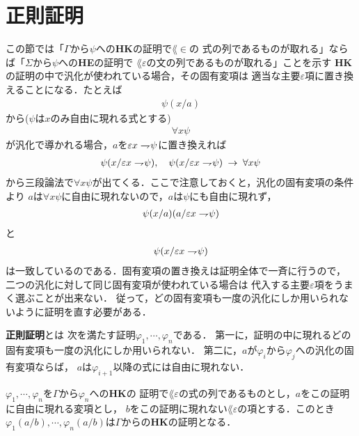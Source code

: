 \section{正則証明}
\label{sec:regular_proof}
	この節では「$\Gamma$から$\psi$への{\bf HK}の証明で$\lang{\in}$の
	式の列であるものが取れる」ならば「$\Sigma$から$\psi$への{\bf HE}の証明で
	$\lang{\varepsilon}$の文の列であるものが取れる」ことを示す
	{\bf HK}の証明の中で汎化が使われている場合，その固有変項は
	適当な主要$\varepsilon$項に置き換えることになる．たとえば
	\begin{align}
		\psi(x/a)
	\end{align}
	から($\psi$は$x$のみ自由に現れる式とする)
	\begin{align}
		\forall x \psi
	\end{align}
	が汎化で導かれる場合，$a$を$\varepsilon x \rightharpoondown\hspace{-0.25em} \psi$に置き換えれば
	\begin{align}
		\psi(x/\varepsilon x \rightharpoondown\hspace{-0.25em} \psi), 
		\quad \psi(x/\varepsilon x \rightharpoondown\hspace{-0.25em} \psi) \hspace{0.25em}\rightarrow\hspace{0.25em} \forall x \psi
	\end{align}
	から三段論法で$\forall x \psi$が出てくる．ここで注意しておくと，汎化の固有変項の条件より
	$a$は$\forall x \psi$に自由に現れないので，$a$は$\psi$にも自由に現れず，
	\begin{align}
		\psi(x/a)(a/\varepsilon x \rightharpoondown\hspace{-0.25em} \psi)
	\end{align}
	と
	\begin{align}
		\psi(x/\varepsilon x \rightharpoondown\hspace{-0.25em} \psi)
	\end{align}
	は一致しているのである．固有変項の置き換えは証明全体で一斉に行うので，
	二つの汎化に対して同じ固有変項が使われている場合は
	代入する主要$\varepsilon$項をうまく選ぶことが出来ない．
	従って，どの固有変項も一度の汎化にしか用いられないように証明を直す必要がある．
	
	\begin{screen}
		\begin{metadfn}[正則証明]
			{\bf 正則証明}とは
			次を満たす証明$\varphi_{1},\cdots,\varphi_{n}$である．
			第一に，証明の中に現れるどの固有変項も一度の汎化にしか用いられない．
			第二に，$a$が$\varphi_{i}$から$\varphi_{j}$への汎化の固有変項ならば，
			$a$は$\varphi_{i+1}$以降の式には自由に現れない．
		\end{metadfn}
	\end{screen}
	
	\begin{screen}
		\begin{metathm}[証明に現れる変項に代入しても証明]
			$\varphi_{1},\cdots,\varphi_{n}$を$\Gamma$から$\varphi_{n}$への{\bf HK}の
			証明で$\lang{\varepsilon}$の式の列であるものとし，$a$をこの証明に自由に現れる変項とし，
			$b$をこの証明に現れない$\lang{\varepsilon}$の項とする．このとき
			$\varphi_{1}(a/b),\cdots,\varphi_{n}(a/b)$は$\Gamma$からの{\bf HK}の証明となる．
		\end{metathm}
	\end{screen}
	
